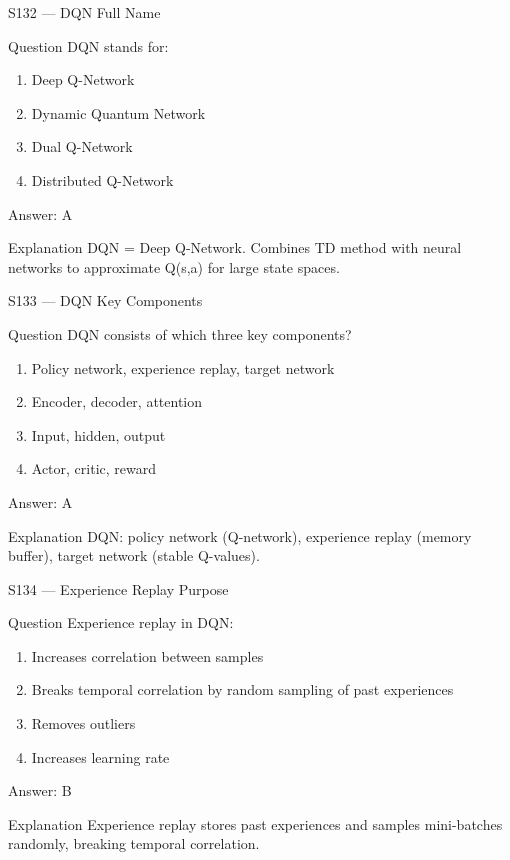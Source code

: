 \documentclass[aspectratio=169,8pt]{beamer}
\begin{document}
	\begin{frame}{S132 --- DQN Full Name}
		\begin{block}{Question}
			DQN stands for:
			\begin{enumerate}
				\item Deep Q-Network
				\item Dynamic Quantum Network
				\item Dual Q-Network
				\item Distributed Q-Network
			\end{enumerate}
		\end{block}
		\begin{exampleblock}{Answer: A}\end{exampleblock}
		\begin{block}{Explanation}
			DQN = Deep Q-Network. Combines TD method with neural networks to approximate Q(s,a) for large state spaces.
		\end{block}
	\end{frame}
	
	\begin{frame}{S133 --- DQN Key Components}
		\begin{block}{Question}
			DQN consists of which three key components?
			\begin{enumerate}
				\item Policy network, experience replay, target network
				\item Encoder, decoder, attention
				\item Input, hidden, output
				\item Actor, critic, reward
			\end{enumerate}
		\end{block}
		\begin{exampleblock}{Answer: A}\end{exampleblock}
		\begin{block}{Explanation}
			DQN: policy network (Q-network), experience replay (memory buffer), target network (stable Q-values).
		\end{block}
	\end{frame}
	
	\begin{frame}{S134 --- Experience Replay Purpose}
		\begin{block}{Question}
			Experience replay in DQN:
			\begin{enumerate}
				\item Increases correlation between samples
				\item Breaks temporal correlation by random sampling of past experiences
				\item Removes outliers
				\item Increases learning rate
			\end{enumerate}
		\end{block}
		\begin{exampleblock}{Answer: B}\end{exampleblock}
		\begin{block}{Explanation}
			Experience replay stores past experiences and samples mini-batches randomly, breaking temporal correlation.
		\end{block}
	\end{frame}
	
\end{document}
